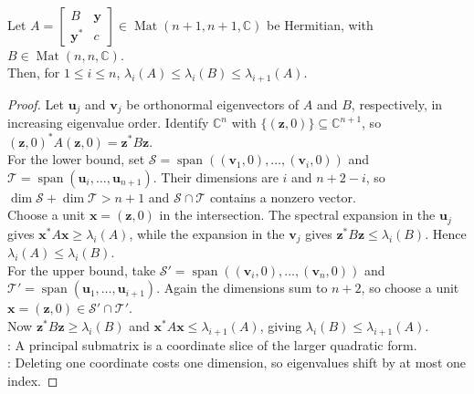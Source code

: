 \begin{theorem} \label{thm:cauchy-principal-submatrix-interlacing} \\
Let $A=
\begin{bmatrix}
B & \mathbf{y}\\
\mathbf{y}^* & c
\end{bmatrix}
\in\operatorname{Mat}(n+1,n+1,\mathbb{C})$ be Hermitian, with $B\in\operatorname{Mat}(n,n,\mathbb{C})$.\\
Then, for $1\leq i\leq n$, $\lambda_i(A)\leq\lambda_i(B)\leq\lambda_{i+1}(A)$.
\begin{proof}
Let $\mathbf{u}_j$ and $\mathbf{v}_j$ be orthonormal eigenvectors of $A$ and $B$, respectively, in increasing eigenvalue order. Identify $\mathbb{C}^n$ with $\{(\mathbf{z},0)\}\subseteq\mathbb{C}^{n+1}$, so $(\mathbf{z},0)^*A(\mathbf{z},0)=\mathbf{z}^*B\mathbf{z}$.\\
For the lower bound, set $\mathcal{S}=\operatorname{span}((\mathbf{v}_1,0),\ldots,(\mathbf{v}_i,0))$ and $\mathcal{T}=\operatorname{span}(\mathbf{u}_i,\ldots,\mathbf{u}_{n+1})$. Their dimensions are $i$ and $n+2-i$, so $\dim\mathcal{S}+\dim\mathcal{T}>n+1$ and $\mathcal{S}\cap\mathcal{T}$ contains a nonzero vector.\\
Choose a unit $\mathbf{x}=(\mathbf{z},0)$ in the intersection. The spectral expansion in the $\mathbf{u}_j$ gives $\mathbf{x}^*A\mathbf{x}\geq\lambda_i(A)$, while the expansion in the $\mathbf{v}_j$ gives $\mathbf{z}^*B\mathbf{z}\leq\lambda_i(B)$. Hence $\lambda_i(A)\leq\lambda_i(B)$.\\
For the upper bound, take $\mathcal{S}'=\operatorname{span}((\mathbf{v}_i,0),\ldots,(\mathbf{v}_n,0))$ and $\mathcal{T}'=\operatorname{span}(\mathbf{u}_1,\ldots,\mathbf{u}_{i+1})$. Again the dimensions sum to $n+2$, so choose a unit $\mathbf{x}=(\mathbf{z},0)\in\mathcal{S}'\cap\mathcal{T}'$.\\
Now $\mathbf{z}^*B\mathbf{z}\geq\lambda_i(B)$ and $\mathbf{x}^*A\mathbf{x}\leq\lambda_{i+1}(A)$, giving $\lambda_i(B)\leq\lambda_{i+1}(A)$.\\
: A principal submatrix is a coordinate slice of the larger quadratic form.\\
: Deleting one coordinate costs one dimension, so eigenvalues shift by at most one index.
\end{proof}
\end{theorem}

